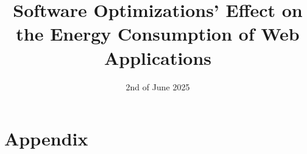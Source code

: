 \documentclass[sigconf]{acmart}
\title{Software Optimizations' Effect on the Energy Consumption of Web Applications}
\date{2nd of June 2025}
\begin{document}



\maketitle












\printbibliography

\clearpage

\onecolumn

\section{Appendix}



\newpage

\end{document}
